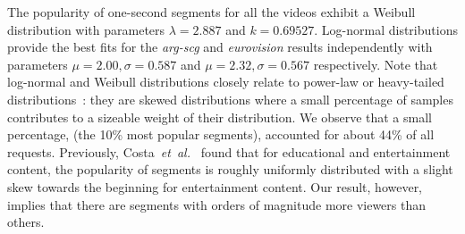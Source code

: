 \documentclass[a4paper,11pt]{article}
\begin{document}







The popularity of one-second segments for all the videos exhibit a Weibull distribution with parameters $\lambda=2.887$ and $k=0.69527$. Log-normal distributions provide the best fits for the  \emph{arg-scg} and \emph{eurovision} results independently with parameters $\mu = 2.00, \sigma = 0.587$ and $\mu = 2.32, \sigma = 0.567$ respectively. Note that log-normal and Weibull distributions closely relate to power-law or heavy-tailed distributions~\cite{mitz,geor06}: they are skewed distributions where a small percentage of samples contributes to a sizeable weight of their distribution. We observe that a small percentage, (the 10\% most popular segments), accounted for about 44\% of all requests. Previously, Costa~\emph{et~al.}~\cite{Costa04Analyzing} found that for educational and entertainment content, the popularity of segments is roughly uniformly distributed with a slight skew towards the beginning for entertainment content. Our result, however, implies that there are segments with orders of magnitude more viewers than others.
\end{document}

